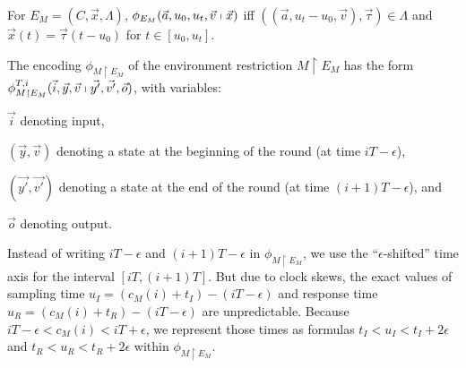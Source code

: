 \begin{definition}
For %
$E_M = (C, \vec{x}, \Lambda)$,
$\phi_{E_M}(\vec{a},u_0,u_t,\vec{v} \shortmid \vec{x})$
iff
$((\vec{a},u_t-u_0,\vec{v}), \vec{\tau}) \in \Lambda$
and $\vec{x}(t) = \vec{\tau}(t - u_0)$ for $t \in [u_0, u_t]$.
\end{definition}

The encoding $\phi_{M \restriction E_M}$ of the 
 environment restriction $M \restriction E_M$
has the form
$\phi_{M \restriction E_M}^{T,i}(\vec{i}, \vec{y}, \vec{v} \shortmid \vec{y'}, \vec{v'}, \vec{o})$,
with variables:
\begin{inparaenum}[(i)]
	\item $\vec{i}$ denoting input, 
	\item $(\vec{y},\vec{v})$ denoting a state  at the beginning of the round 
		(at time $iT - \epsilon$),
	\item $(\vec{y'},\vec{v'})$ denoting a state at the end of the round 
		(at time $(i+1)T - \epsilon$), and 
	\item $\vec{o}$ denoting output.
\end{inparaenum}
%
Instead of  writing $iT - \epsilon$ and $(i+1)T - \epsilon$  in $\phi_{M \restriction E_M}$,
we use the ``$\epsilon$-shifted''  time axis for the interval $[iT, (i+1)T]$. %
%
But due to clock skews, 
the exact values of sampling time $u_I = (c_M(i)+t_I)-(iT-\epsilon)$
and response time $u_R = (c_M(i)+t_R)-(iT-\epsilon)$ are unpredictable. 
Because $iT - \epsilon < c_M(i) < iT + \epsilon$,
we represent those times as formulas 
$t_I < u_I < t_I + 2\epsilon$ and $t_R < u_R < t_R + 2\epsilon$
within $\phi_{M \restriction E_M}$.






